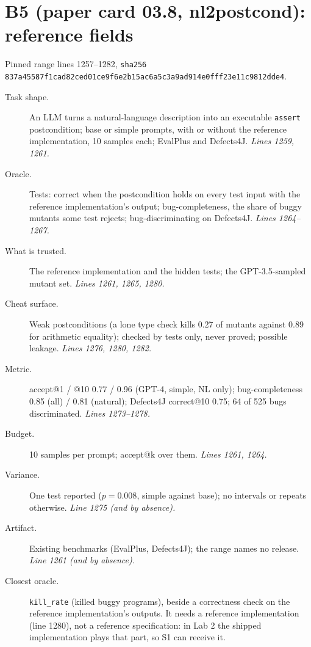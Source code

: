 \documentclass[11pt]{article}
\begin{document}
\section*{B5 (paper card 03.8, nl2postcond): reference fields}
Pinned range lines 1257--1282,
\texttt{sha256 837a45587f1cad82ced01ce9f6e2b15ac6a5c3a9ad914e0fff23e11c9812dde4}.
\begin{description}
\item[Task shape.] An LLM turns a natural-language description into an
  executable \texttt{assert} postcondition; base or simple prompts, with or
  without the reference implementation, 10 samples each; EvalPlus and
  Defects4J. \emph{Lines 1259, 1261.}
\item[Oracle.] Tests: correct when the postcondition holds on every test input
  with the reference implementation's output; bug-completeness, the share of
  buggy mutants some test rejects; bug-discriminating on Defects4J.
  \emph{Lines 1264--1267.}
\item[What is trusted.] The reference implementation and the hidden tests;
  the GPT-3.5-sampled mutant set. \emph{Lines 1261, 1265, 1280.}
\item[Cheat surface.] Weak postconditions (a lone type check kills 0.27 of
  mutants against 0.89 for arithmetic equality); checked by tests only, never
  proved; possible leakage. \emph{Lines 1276, 1280, 1282.}
\item[Metric.] accept@1 / @10 0.77 / 0.96 (GPT-4, simple, NL only);
  bug-completeness 0.85 (all) / 0.81 (natural); Defects4J correct@10 0.75;
  64 of 525 bugs discriminated. \emph{Lines 1273--1278.}
\item[Budget.] 10 samples per prompt; accept@k over them. \emph{Lines 1261,
  1264.}
\item[Variance.] One test reported ($p = 0.008$, simple against base); no
  intervals or repeats otherwise. \emph{Line 1275 (and by absence).}
\item[Artifact.] Existing benchmarks (EvalPlus, Defects4J); the range names
  no release. \emph{Line 1261 (and by absence).}
\item[Closest oracle.] \texttt{kill\_rate} (killed buggy programs), beside a
  correctness check on the reference implementation's outputs. It needs a
  reference implementation (line 1280), not a reference specification: in
  Lab 2 the shipped implementation plays that part, so S1 can receive it.
\end{description}
\end{document}
